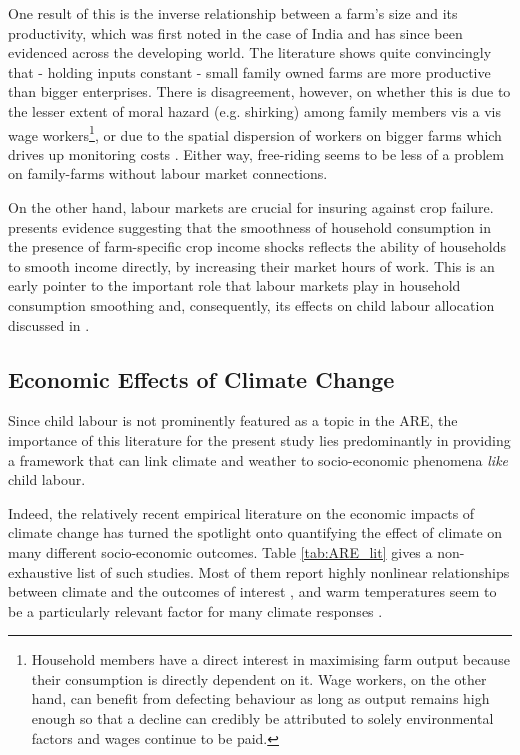\documentclass[a4paper,12pt]{article}
\theoremstyle{plain}
\theoremstyle{definition}
\theoremstyle{definition}
\theoremstyle{definition}
\theoremstyle{definition}
\begin{document}
One result of this is the inverse relationship between a farm's size and its productivity, which was first noted in the case of India \citep{Sen1962} and has since been evidenced across the developing world. The literature shows quite convincingly that - holding inputs constant - small family owned farms are more productive than bigger enterprises. There is disagreement, however, on whether this is due to the lesser extent of moral hazard (e.g. shirking) among family members vis a vis wage workers\footnote{Household members have a direct interest in maximising farm output because their consumption is directly dependent on it. Wage workers, on the other hand, can benefit from defecting behaviour as long as output remains high enough so that a decline can credibly be attributed to solely environmental factors and wages continue to be paid.}, or due to the spatial dispersion of workers on bigger farms which drives up monitoring costs \citep{Sen1981a}. Either way, free-riding seems to be less of a problem on family-farms without labour market connections.

On the other hand, labour markets are crucial for insuring against crop failure. \citet{Kochar1999} presents evidence suggesting that the smoothness of household consumption in the presence of farm-specific crop income shocks reflects the ability of households to smooth income directly, by increasing their market hours of work. This is an early pointer to the important role that labour markets play in household consumption smoothing and, consequently, its effects on child labour allocation discussed in \citet{Dumas2015,Dumas2020}.

\subsection{Economic Effects of Climate Change}
\label{sub:economic_effects_of_climate_change}

 Since child labour is not prominently featured as a topic in the ARE, the importance of this literature for the present study lies predominantly in providing a framework that can link climate and weather to socio-economic phenomena \textit{like} child labour.

Indeed, the relatively recent empirical literature on the economic impacts of climate change has turned the spotlight onto quantifying the effect of climate on many different socio-economic outcomes. Table \ref{tab:ARE_lit} gives a non-exhaustive list of such studies. Most of them report highly nonlinear relationships between climate and the outcomes of interest \citep[e.g.][]{Schlenker2009,Burke2015}, and warm temperatures seem to be a particularly relevant factor for many climate responses \citep{Auffhammer2013}.
\end{document}
